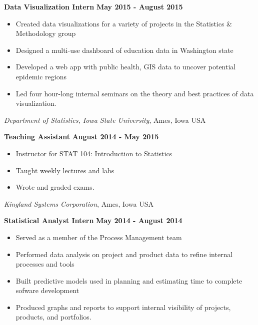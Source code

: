 \documentclass[margin,line]{res}
\begin{document}
\begin{resume}
{\bf Data Visualization Intern} \hfill {\bf May 2015 - August 2015}\\
\vspace{-.3cm}
\begin{itemize}
\setlength\itemsep{0em}
\item Created data visualizations for a variety of projects in the Statistics \& Methodology group
\item Designed a multi-use dashboard of education data in Washington state
\item Developed a web app with public health, GIS data to uncover potential epidemic regions
\item Led four hour-long internal seminars on the theory and best practices of data visualization.  
\end{itemize}

\vspace{-.3cm}


{\em Department of Statistics, Iowa State University}, Ames, Iowa USA

\vspace{-.3cm}

{\bf Teaching Assistant} \hfill {\bf August 2014 - May 2015}\\
\vspace{-.3cm}
\begin{itemize}
\setlength\itemsep{0em}
\item Instructor for STAT 104: Introduction to Statistics
\item Taught weekly lectures and labs
\item Wrote and graded exams.
\end{itemize}
 

{\em Kingland Systems Corporation}, Ames, Iowa USA

\vspace{-.3cm}

{\bf Statistical Analyst Intern} \hfill {\bf May 2014 - August 2014}\\
\vspace{-.3cm}
\begin{itemize}
\setlength\itemsep{0em}
\item Served as a member of the Process Management team 
\item Performed data analysis on project and product data to refine internal processes and tools
\item Built predictive models used in planning and estimating time to complete sofware development
\item Produced graphs and reports to support internal visibility of projects, products, and portfolios. 
\end{itemize}


\end{resume}
\end{document}
